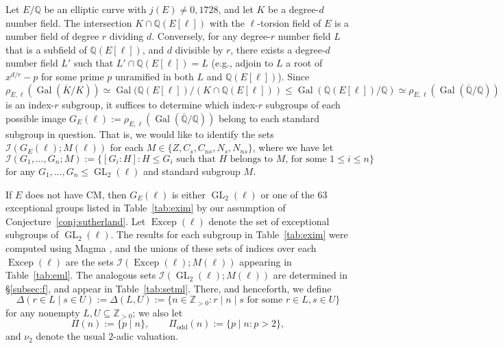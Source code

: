 \documentclass[table,dvipsnames]{amsart}
\newcommand{\Q}{\mathbb{Q}}
\newcommand{\Qbar}{\overline{\Q}}
\newcommand{\Gal}{\operatorname{Gal}}
\newcommand{\GL}{\operatorname{GL}}
\newcommand{\Z}{\mathbb{Z}}
\newcommand{\Kbar}{\overline K}
\newcommand{\I}{\mathcal{I}}
\newcommand{\odd}{\mathrm{odd}}
\numberwithin{equation}{section}
\newcommand{\s}{\textit{s}}
\newcommand{\ns}{\textit{ns}}
\newcommand{\Cs}{C_\s}
\newcommand{\Cns}{C_\ns}
\newcommand{\Ns}{N_\s}
\newcommand{\Nns}{N_\ns}
\newcommand{\Excep}{\operatorname{Excep}}
\begin{document}
Let $E/\Q$ be an elliptic curve with $j(E)\ne 0,1728$, and let $K$ be a degree-$d$ number field. The intersection $K\cap\Q(E[\ell])$ with the $\ell$-torsion field of $E$ is a number field of degree $r$ dividing $d$. Conversely, for any degree-$r$ number field $L$ that is a subfield of $\Q(E[\ell])$, and $d$ divisible by $r$, there exists a degree-$d$ number field $L'$ such that $L'\cap\Q(E[\ell])=L$ (e.g., adjoin to $L$ a root of $x^{d/r}-p$ for some prime $p$ unramified in both $L$ and $\Q(E[\ell])$). Since
\begin{equation}
\label{eqn:galisomsub}
\rho_{E,\ell}(\Gal(\Kbar/K))\simeq\Gal(\Q(E[\ell])/(K\cap\Q(E[\ell]))\le\Gal(\Q(E[\ell])/\Q)\simeq\rho_{E,\ell}(\Gal(\Qbar/\Q))
\end{equation}
is an index-$r$ subgroup, it suffices to determine which index-$r$ subgroups of each possible image $G_E(\ell):=\rho_{E,\ell}(\Gal(\Qbar/\Q))$ belong to each standard subgroup in question. That is, we would like to identify the sets $\I(G_E(\ell);M(\ell))$ for each $M\in\{Z,\Cs,\Cns,\Ns,\Nns\}$, where we have let
\begin{equation}
\label{eqn:IGM}
\I(G_1,\ldots,G_n;M):=\{[G_i:H]:H\le G_i\text{ such that }H\text{ belongs to }M\text{, for some }1\le i\le n\}
\end{equation}
for any $G_1,\ldots,G_n\le\GL_2(\ell)$ and standard subgroup $M$.

If $E$ does not have CM, then $G_E(\ell)$ is either $\GL_2(\ell)$ or one of the $63$ exceptional groups listed in Table~\ref{tab:exim} by our assumption of Conjecture~\ref{conj:sutherland}. Let \(\Excep(\ell)\) denote the set of exceptional subgroups of \(\GL_2(\ell)\). The results for each subgroup in Table~\ref{tab:exim} were computed \cite{code,sutherland2016} using Magma \cite{magma}, and the unions of these sets of indices over each \(\Excep(\ell)\) are the sets $\I(\Excep(\ell);M(\ell))$ appearing in Table~\ref{tab:eml}. The analogous sets $\I(\GL_2(\ell);M(\ell))$ are determined in \S\ref{subsec:f}, and appear in Table~\ref{tab:setml}. There, and henceforth, we define
\begin{equation}
\label{eqn:delta}
\Delta(r\in L\mid s\in U):=\Delta(L,U):=\{n\in\Z_{>0}:r\mid n\mid s\text{ for some }r\in L,s\in U\}
\end{equation}
for any nonempty $L,U\subseteq\Z_{>0}$; we also let
\begin{equation}
\label{eqn:piodd}
\Pi(n):=\{p\mid n\},\qquad\Pi_\odd(n):=\{p\mid n:p>2\},
\end{equation}
and $\nu_2$ denote the usual $2$-adic valuation.
\end{document}
